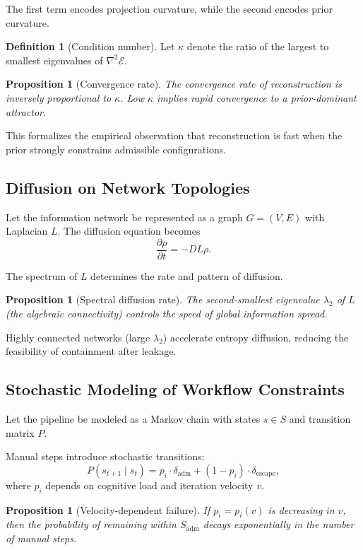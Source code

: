 \documentclass[12pt, oneside]{article}
\theoremstyle{plain}
\newtheorem{proposition}[theorem]{Proposition}
\theoremstyle{definition}
\newtheorem{definition}[theorem]{Definition}
\theoremstyle{remark}
\newcommand{\energy}{\mathcal{E}}
\begin{document}
The first term encodes projection curvature, while the second encodes prior curvature.

\begin{definition}[Condition number]
Let $\kappa$ denote the ratio of the largest to smallest eigenvalues of $\nabla^2 \energy$.
\end{definition}

\begin{proposition}[Convergence rate]
The convergence rate of reconstruction is inversely proportional to $\kappa$.
Low $\kappa$ implies rapid convergence to a prior-dominant attractor.
\end{proposition}

This formalizes the empirical observation that reconstruction is fast when the
prior strongly constrains admissible configurations.

\subsection{Diffusion on Network Topologies}

Let the information network be represented as a graph $G = (V, E)$ with Laplacian $L$.
The diffusion equation becomes
\[
  \frac{\partial \rho}{\partial t} = -D L \rho.
\]

The spectrum of $L$ determines the rate and pattern of diffusion.

\begin{proposition}[Spectral diffusion rate]
The second-smallest eigenvalue $\lambda_2$ of $L$ (the algebraic connectivity)
controls the speed of global information spread.
\end{proposition}

Highly connected networks (large $\lambda_2$) accelerate entropy diffusion,
reducing the feasibility of containment after leakage.

\subsection{Stochastic Modeling of Workflow Constraints}

Let the pipeline be modeled as a Markov chain with states $s \in S$ and transition matrix $P$.

Manual steps introduce stochastic transitions:
\[
  P(s_{t+1} \mid s_t) = p_i \cdot \delta_{\text{adm}} + (1 - p_i) \cdot \delta_{\text{escape}},
\]
where $p_i$ depends on cognitive load and iteration velocity $v$.

\begin{proposition}[Velocity-dependent failure]
If $p_i = p_i(v)$ is decreasing in $v$, then the probability of remaining within
$S_{\text{adm}}$ decays exponentially in the number of manual steps.
\end{proposition}
\end{document}
